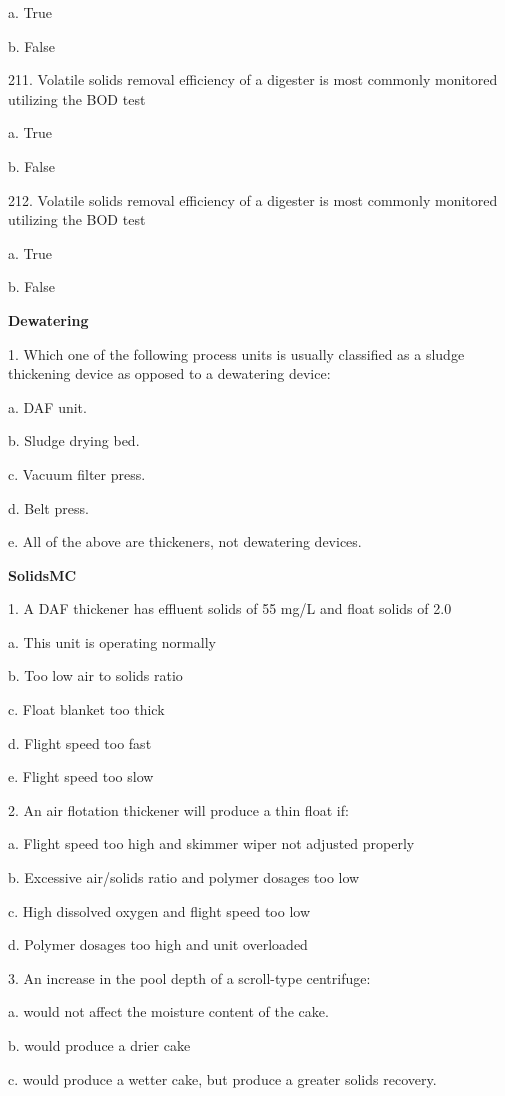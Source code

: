 \documentclass{article}
\begin{document}
a. True 

b. False 


211. Volatile solids removal efficiency of a digester is most commonly monitored utilizing the BOD test 

a. True 

b. False 


212. Volatile solids removal efficiency of a digester is most commonly monitored utilizing the BOD test 

a. True 

b. False 


\textbf{Dewatering}

1. Which one of the following process units is usually classified as a sludge thickening device as opposed to a dewatering device: 

a. DAF unit. 

b. Sludge drying bed. 

c. Vacuum filter press. 

d. Belt press. 

e. All of the above are thickeners, not dewatering devices. 


\textbf{SolidsMC}

1. A DAF thickener has effluent solids of 55 mg/L and float solids of 2.0%

a. This unit is operating normally 

b. Too low air to solids ratio 

c. Float blanket too thick 

d. Flight speed too fast 

e. Flight speed too slow 


2. An air flotation thickener will produce a thin float if: 

a. Flight speed too high and skimmer wiper not adjusted properly 

b. Excessive air/solids ratio and polymer dosages too low 

c. High dissolved oxygen and flight speed too low 

d. Polymer dosages too high and unit overloaded 


3. An increase in the pool depth of a scroll-type centrifuge: 

a. would not affect the moisture content of the cake. 

b. would produce a drier cake 

c. would produce a wetter cake, but produce a greater solids recovery. 
\end{document}
